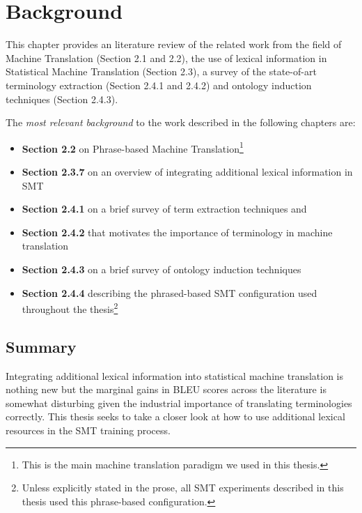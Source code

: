 \chapter{Background}
\label{chap:background}

This chapter provides an literature review of the related work from the field of Machine Translation (Section 2.1 and 2.2), the use of lexical information in Statistical Machine Translation (Section 2.3), a survey of the state-of-art terminology extraction (Section 2.4.1 and 2.4.2) and ontology induction techniques (Section 2.4.3).

The \textit{most relevant background} to the work described in the following chapters are:

\begin{itemize}
\item \textbf{Section 2.2} on Phrase-based Machine Translation\footnote{This is the main machine translation paradigm we used in this thesis.}
\item \textbf{Section 2.3.7} on an overview of integrating additional lexical information in SMT
\item \textbf{Section 2.4.1} on a brief survey of term extraction techniques and 
\item \textbf{Section 2.4.2} that motivates the importance of terminology in machine translation
\item \textbf{Section 2.4.3} on a brief survey of ontology induction techniques
\item \textbf{Section 2.4.4} describing the phrased-based SMT configuration used throughout the thesis\footnote{Unless explicitly stated in the prose, all SMT experiments described in this thesis used this phrase-based configuration.}
\end{itemize}

\newpage









\section{Summary}

Integrating additional lexical information into statistical machine translation is nothing new but the marginal gains in BLEU scores across the literature is somewhat disturbing given the industrial importance of translating terminologies correctly. This thesis seeks to take a closer look at how to use additional lexical resources in the SMT training process. 


